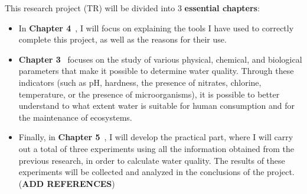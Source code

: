 This research project (TR) will be divided into 3 \textbf{essential chapters}:

\begin{itemize}
\item In \textbf{Chapter 4}~, I will focus on explaining the tools I have used to correctly complete this project, as well as the reasons for their use.

\item \textbf{Chapter 3}~ focuses on the study of various physical, chemical, and biological parameters that make it possible to determine water quality. Through these indicators (such as pH, hardness, the presence of nitrates, chlorine, temperature, or the presence of microorganisms), it is possible to better understand to what extent water is suitable for human consumption and for the maintenance of ecosystems.

\item Finally, in \textbf{Chapter 5}~, I will develop the practical part, where I will carry out a total of three experiments using all the information obtained from the previous research, in order to calculate water quality. The results of these experiments will be collected and analyzed in the conclusions of the project. (\textbf{ADD REFERENCES})
\end{itemize}

